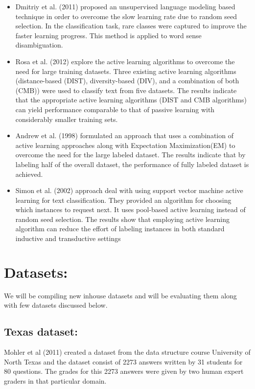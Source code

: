 \documentclass[rnd]{mas_proposal}
\begin{document}
\begin{itemize}
	\item Dmitriy et al. (2011) \cite{dligach2011} proposed an unsupervised language modeling based technique in order to overcome the slow learning rate due to random seed selection. In the classification task, rare classes were captured to improve the faster learning progress. This method is applied to word sense disambiguation.
	\item Rosa et al. (2012) \cite{figueroa2012} explore the active learning algorithms to overcome the need for large training datasets. Three existing active learning algorithms (distance-based (DIST), diversity-based (DIV), and a combination of both (CMB)) were used to classify text from five datasets.  The results indicate that the appropriate active learning algorithms (DIST and CMB algorithms) can yield performance comparable to that of passive learning with considerably smaller training sets.
	\item Andrew et al. (1998) \cite{mccallumzy1998} formulated an approach that uses a combination of active learning approaches along with Expectation Maximization(EM)  to overcome the need for the large labeled dataset. The results indicate that by labeling half of the overall dataset, the performance of fully labeled dataset is achieved.
	\item Simon et al. (2002)\cite{tong2001} approach deal with using support vector machine active learning for text classification. They provided an algorithm for choosing which instances to request next. It uses pool-based active learning instead of random seed selection. The results show that employing active learning algorithm can reduce the effort of labeling instances in both standard inductive and transductive settings

\end{itemize}

\section{Datasets:}
We will be compiling new inhouse datasets and will be evaluating them along with few datasets discussed below.
\subsection{Texas dataset:}
Mohler et al (2011)\cite{Mohler2011} created a dataset from the data structure course University of North Texas and the dataset consist of 2273 answers written by 31 students for 80 questions. The grades for this 2273 answers were given by two human expert graders in that particular domain.
\end{document}
